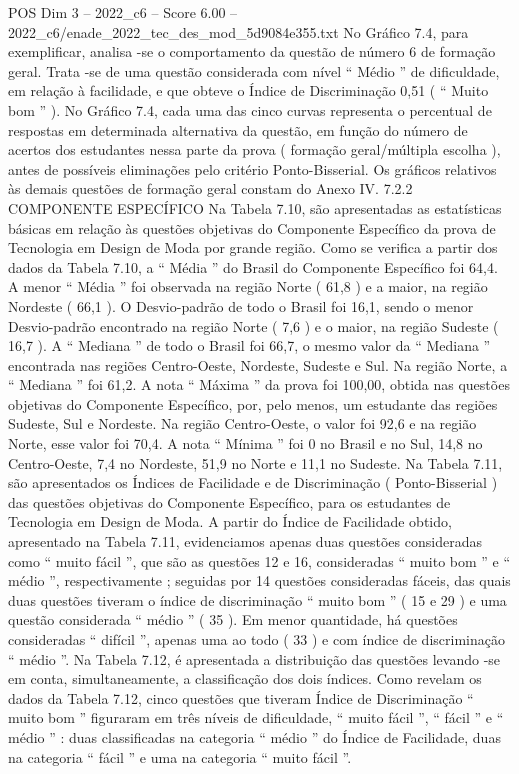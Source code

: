 \begin{textsample}{POS Dim 3 – 2022\_c6 – Score 6.00 – 2022\_c6/enade\_2022\_tec\_des\_mod\_5d9084e355.txt}
No Gráfico 7.4, para exemplificar, analisa -se o comportamento da questão de número 6 de formação geral.
Trata -se de uma questão considerada com nível “ Médio ” de dificuldade, em relação à facilidade, e que obteve o Índice de Discriminação 0,51 ( “ Muito bom ” ).
No Gráfico 7.4, cada uma das cinco curvas representa o percentual de respostas em determinada alternativa da questão, em função do número de acertos dos estudantes nessa parte da prova ( formação geral/múltipla escolha ), antes de possíveis eliminações pelo critério Ponto-Bisserial.
Os gráficos relativos às demais questões de formação geral constam do Anexo IV. 7.2.2 COMPONENTE ESPECÍFICO Na Tabela 7.10, são apresentadas as estatísticas básicas em relação às questões objetivas do Componente Específico da prova de Tecnologia em Design de Moda por grande região.
Como se verifica a partir dos dados da Tabela 7.10, a “ Média ” do Brasil do Componente Específico foi 64,4.
A menor “ Média ” foi observada na região Norte ( 61,8 ) e a maior, na região Nordeste ( 66,1 ).
O Desvio-padrão de todo o Brasil foi 16,1, sendo o menor Desvio-padrão encontrado na região Norte ( 7,6 ) e o maior, na região Sudeste ( 16,7 ).
A “ Mediana ” de todo o Brasil foi 66,7, o mesmo valor da “ Mediana ” encontrada nas regiões Centro-Oeste, Nordeste, Sudeste e Sul.
Na região Norte, a “ Mediana ” foi 61,2.
A nota “ Máxima ” da prova foi 100,00, obtida nas questões objetivas do Componente Específico, por, pelo menos, um estudante das regiões Sudeste, Sul e Nordeste.
Na região Centro-Oeste, o valor foi 92,6 e na região Norte, esse valor foi 70,4.
A nota “ Mínima ” foi 0 no Brasil e no Sul, 14,8 no Centro-Oeste, 7,4 no Nordeste, 51,9 no Norte e 11,1 no Sudeste.
Na Tabela 7.11, são apresentados os Índices de Facilidade e de Discriminação ( Ponto-Bisserial ) das questões objetivas do Componente Específico, para os estudantes de Tecnologia em Design de Moda.
A partir do Índice de Facilidade obtido, apresentado na Tabela 7.11, evidenciamos apenas duas questões consideradas como “ muito fácil ”, que são as questões 12 e 16, consideradas “ muito bom ” e “ médio ”, respectivamente ; seguidas por 14 questões consideradas fáceis, das quais duas questões tiveram o índice de discriminação “ muito bom ” ( 15 e 29 ) e uma questão considerada “ médio ” ( 35 ).
Em menor quantidade, há questões consideradas “ difícil ”, apenas uma ao todo ( 33 ) e com índice de discriminação “ médio ”.
Na Tabela 7.12, é apresentada a distribuição das questões levando -se em conta, simultaneamente, a classificação dos dois índices.
Como revelam os dados da Tabela 7.12, cinco questões que tiveram Índice de Discriminação “ muito bom ” figuraram em três níveis de dificuldade, “ muito fácil ”, “ fácil ” e “ médio ” : duas classificadas na categoria “ médio ” do Índice de Facilidade, duas na categoria “ fácil ” e uma na categoria “ muito fácil ”.

\end{textsample}

